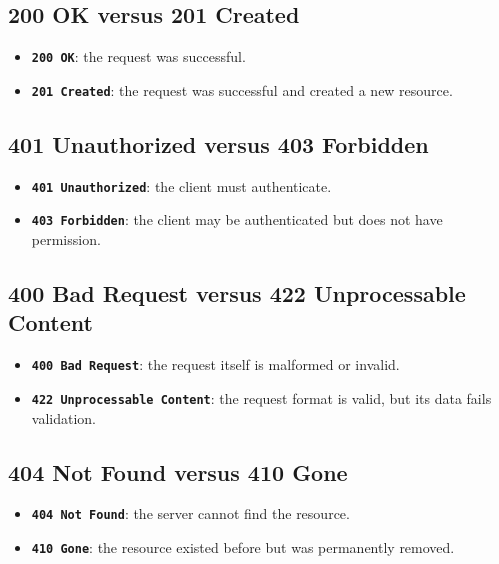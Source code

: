 \documentclass[a4paper]{article}
\newcommand{\httpcode}[1]{\texttt{\textbf{#1}}}
\begin{document}
        \subsection{200 OK versus 201 Created}
            
            \begin{itemize}
                \item \httpcode{200 OK}: the request was successful.
                \item \httpcode{201 Created}: the request was successful and created a new resource.
            \end{itemize}
        
        \subsection{401 Unauthorized versus 403 Forbidden}
            
            \begin{itemize}
                \item \httpcode{401 Unauthorized}: the client must authenticate.
                \item \httpcode{403 Forbidden}: the client may be authenticated but does not have permission.
            \end{itemize}
        
        \subsection{400 Bad Request versus 422 Unprocessable Content}
            
            \begin{itemize}
                \item \httpcode{400 Bad Request}: the request itself is malformed or invalid.
                \item \httpcode{422 Unprocessable Content}: the request format is valid, but its data fails validation.
            \end{itemize}
        
        \subsection{404 Not Found versus 410 Gone}
            
            \begin{itemize}
                \item \httpcode{404 Not Found}: the server cannot find the resource.
                \item \httpcode{410 Gone}: the resource existed before but was permanently removed.
            \end{itemize}
    
\end{document}

